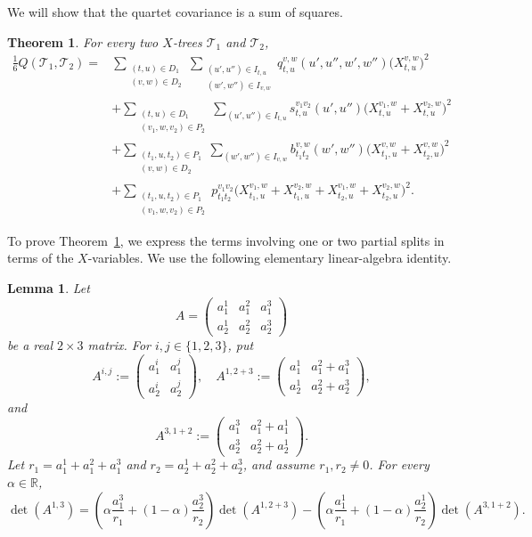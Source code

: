 \documentclass[pdflatex,sn-mathphys-num]{sn-jnl}
\theoremstyle{thmstyleone}
\newtheorem{theorem}{Theorem}
\newtheorem{lemma}{Lemma}
\begin{document}
We will show that the quartet covariance is a sum of squares.

\begin{theorem}\label{thm:sum-of-squares}
For every two $X$-trees $\mathcal T_1$ and $\mathcal T_2$,
\begin{align*}
\frac16Q(\mathcal T_1,\mathcal T_2)
={}&\sum_{\substack{(t,u)\in D_1\\(v,w)\in D_2}}
\sum_{\substack{(u',u'')\in I_{t,u}\\(w',w'')\in I_{v,w}}}
q_{t,u}^{v,w}(u',u'',w',w'')\bigl(X_{t,u}^{v,w}\bigr)^2\\
&+\sum_{\substack{(t,u)\in D_1\\(v_1,w,v_2)\in P_2}}
\sum_{(u',u'')\in I_{t,u}}
s_{t,u}^{v_1v_2}(u',u'')
\bigl(X_{t,u}^{v_1,w}+X_{t,u}^{v_2,w}\bigr)^2\\
&+\sum_{\substack{(t_1,u,t_2)\in P_1\\(v,w)\in D_2}}
\sum_{(w',w'')\in I_{v,w}}
b_{t_1t_2}^{v,w}(w',w'')
\bigl(X_{t_1,u}^{v,w}+X_{t_2,u}^{v,w}\bigr)^2\\
&+\sum_{\substack{(t_1,u,t_2)\in P_1\\(v_1,w,v_2)\in P_2}}
p_{t_1t_2}^{v_1v_2}
\bigl(X_{t_1,u}^{v_1,w}+X_{t_1,u}^{v_2,w}
+X_{t_2,u}^{v_1,w}+X_{t_2,u}^{v_2,w}\bigr)^2.
\end{align*}
\end{theorem}

To prove Theorem~\ref{thm:sum-of-squares}, we express the terms involving
one or two partial splits in terms of the $X$-variables.  We use the
following elementary linear-algebra identity.

\begin{lemma}\label{lem:matrix-identity}
Let
\[
A=\begin{pmatrix}a_1^1&a_1^2&a_1^3\\a_2^1&a_2^2&a_2^3\end{pmatrix}
\]
be a real $2\times3$ matrix.  For $i,j\in\{1,2,3\}$, put
\[
A^{i,j}:=\begin{pmatrix}a_1^i&a_1^j\\a_2^i&a_2^j\end{pmatrix},
\quad
A^{1,2+3}:=\begin{pmatrix}a_1^1&a_1^2+a_1^3\\
a_2^1&a_2^2+a_2^3\end{pmatrix},
\]
and
\[
A^{3,1+2}:=\begin{pmatrix}a_1^3&a_1^2+a_1^1\\
a_2^3&a_2^2+a_2^1\end{pmatrix}.
\]
Let $r_1=a_1^1+a_1^2+a_1^3$ and
$r_2=a_2^1+a_2^2+a_2^3$, and assume $r_1,r_2\ne0$.  For every
$\alpha\in\mathbb R$,
\[
\det(A^{1,3})=
\left(\alpha\frac{a_1^3}{r_1}+(1-\alpha)\frac{a_2^3}{r_2}\right)
\det(A^{1,2+3})
-\left(\alpha\frac{a_1^1}{r_1}+(1-\alpha)\frac{a_2^1}{r_2}\right)
\det(A^{3,1+2}).
\]
\end{lemma}
\end{document}
